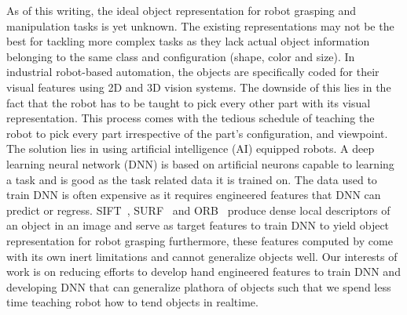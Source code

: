 As of this writing, the ideal object representation for robot grasping and manipulation tasks is yet unknown.
The existing representations may not be the best for tackling more complex tasks as they lack actual
object information belonging to the same class and configuration (shape, color and size).
In industrial robot-based automation, the objects are specifically coded for their visual features using 2D and 3D vision systems.
The downside of this lies in the fact that the robot has to be taught to pick every other part with its visual representation.
This process comes with the tedious schedule of teaching the robot to pick every part
irrespective of the part's configuration, and viewpoint. The solution lies in using artificial intelligence (AI) equipped robots.
A deep learning neural network (DNN) is based on artificial neurons capable to learning a task and is good as the task related
data it is trained on. The data used to train DNN is often expensive as it requires engineered features that DNN can predict or regress.
SIFT~\cite{sift}, SURF~\cite{bay2008speeded} and ORB~\cite{rublee2011orb} produce dense local descriptors of an object in an image
and serve as target features to train DNN
to yield object representation for robot grasping furthermore, these features computed by \parencites{sift}{bay2008speeded}{rublee2011orb} come with its own inert
limitations and cannot generalize objects well. Our interests of work is on reducing efforts to develop hand engineered features to train DNN
and developing DNN that can generalize plathora of objects such that we spend less time teaching robot how to tend objects in realtime.



